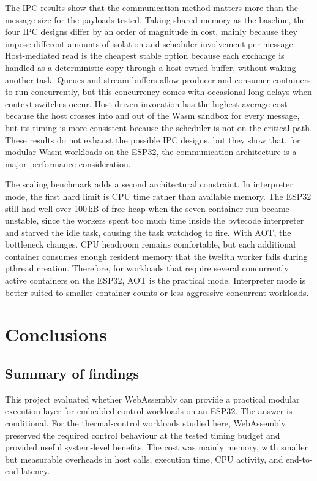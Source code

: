 \documentclass[12pt, a4paper]{report}
\begin{document}
The IPC results show that the communication method matters more than the message size for the payloads tested. Taking shared memory as the baseline, the four IPC designs differ by an order of magnitude in cost, mainly because they impose different amounts of isolation and scheduler involvement per message. Host-mediated read is the cheapest stable option because each exchange is handled as a deterministic copy through a host-owned buffer, without waking another task. Queues and stream buffers allow producer and consumer containers to run concurrently, but this concurrency comes with occasional long delays when context switches occur. Host-driven invocation has the highest average cost because the host crosses into and out of the Wasm sandbox for every message, but its timing is more consistent because the scheduler is not on the critical path. These results do not exhaust the possible IPC designs, but they show that, for modular Wasm workloads on the ESP32, the communication architecture is a major performance consideration.

The scaling benchmark adds a second architectural constraint. In interpreter mode, the first hard limit is CPU time rather than available memory. The ESP32 still had well over 100\,kB of free heap when the seven-container run became unstable, since the workers spent too much time inside the bytecode interpreter and starved the idle task, causing the task watchdog to fire. With AOT, the bottleneck changes. CPU headroom remains comfortable, but each additional container consumes enough resident memory that the twelfth worker fails during pthread creation. Therefore, for workloads that require several concurrently active containers on the ESP32, AOT is the practical mode. Interpreter mode is better suited to smaller container counts or less aggressive concurrent workloads.



\chapter{Conclusions}
\label{ch:conclusion}

\section{Summary of findings}

This project evaluated whether WebAssembly can provide a practical modular execution layer for embedded control workloads on an ESP32. The answer is conditional. For the thermal-control workloads studied here, WebAssembly preserved the required control behaviour at the tested timing budget and provided useful system-level benefits. The cost was mainly memory, with smaller but measurable overheads in host calls, execution time, CPU activity, and end-to-end latency.
\end{document}
